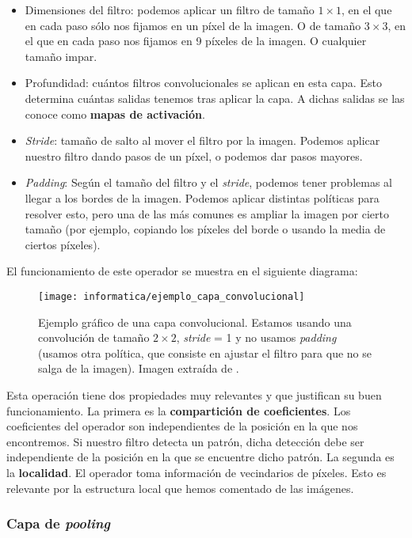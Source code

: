 \begin{itemize}
	\item Dimensiones del filtro: podemos aplicar un filtro de tamaño $1 \times 1$, en el que en cada paso sólo nos fijamos en un píxel de la imagen. O de tamaño $3 \times 3$, en el que en cada paso nos fijamos en 9 píxeles de la imagen. O cualquier tamaño impar.
	\item Profundidad: cuántos filtros convolucionales se aplican en esta capa. Esto determina cuántas salidas tenemos tras aplicar la capa. A dichas salidas se las conoce como \textbf{mapas de activación}.
	\item \textit{Stride}: tamaño de salto al mover el filtro por la imagen. Podemos aplicar nuestro filtro dando pasos de un píxel, o podemos dar pasos mayores.
	\item \textit{Padding}: Según el tamaño del filtro y el \textit{stride}, podemos tener problemas al llegar a los bordes de la imagen. Podemos aplicar distintas políticas para resolver esto, pero una de las más comunes es ampliar la imagen por cierto tamaño (por ejemplo, copiando los píxeles del borde o usando la media de ciertos píxeles).
\end{itemize}

El funcionamiento de este operador se muestra en el siguiente diagrama:

\begin{figure}[H]
	\centering
	\texttt{[image: informatica/ejemplo\_capa\_convolucional]}
	\caption{Ejemplo gráfico de una capa convolucional. Estamos usando una convolución de tamaño $2 \times 2$, \textit{stride} = 1 y no usamos \textit{padding} (usamos otra política, que consiste en ajustar el filtro para que no se salga de la imagen). Imagen extraída de \cite{informatica:paper_definicion_cnn}.}
\end{figure}

Esta operación tiene dos propiedades muy relevantes y que justifican su buen funcionamiento. La primera es la \textbf{compartición de coeficientes}. Los coeficientes del operador son independientes de la posición en la que nos encontremos. Si nuestro filtro detecta un patrón, dicha detección debe ser independiente de la posición en la que se encuentre dicho patrón. La segunda es la \textbf{localidad}. El operador toma información de vecindarios de píxeles. Esto es relevante por la estructura local que hemos comentado de las imágenes.

\subsubsection{Capa de \textit{pooling}}

